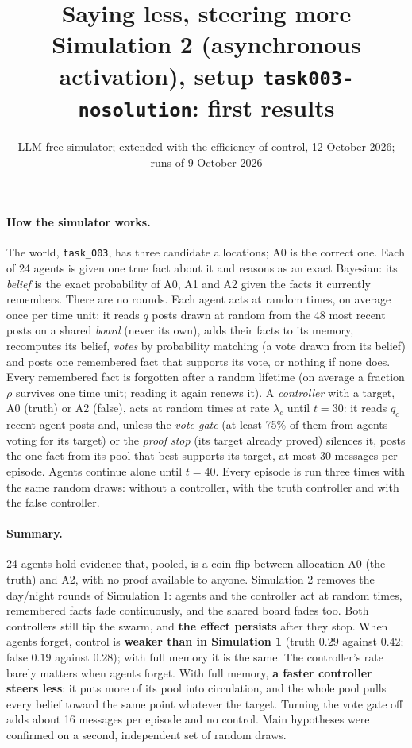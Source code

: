 \documentclass[10pt,a4paper]{article}
\title{\vspace{-1.2cm}\textbf{Saying less, steering more}\\[2pt]
\large Simulation 2 (asynchronous activation), setup \texttt{task003-nosolution}: first results}
\author{LLM-free simulator; extended with the efficiency of control, 12 October 2026; runs of 9 October 2026}
\date{}
\begin{document}
\maketitle
\vspace{-1cm}

\paragraph{How the simulator works.} The world, \texttt{task\_003}, has three candidate
allocations; A0 is the correct one. Each of 24 agents is given one true fact about it and reasons as
an exact Bayesian: its \emph{belief} is the exact probability of A0, A1 and A2 given the facts it
currently remembers. There are no rounds. Each agent acts at random times, on average once per time
unit: it reads $q$ posts drawn at random from the 48 most recent posts on a shared \emph{board}
(never its own), adds their facts to its memory, recomputes its belief, \emph{votes} by probability
matching (a vote drawn from its belief) and posts one remembered fact that supports its vote, or
nothing if none does. Every remembered fact is forgotten after a random lifetime (on average a
fraction $\rho$ survives one time unit; reading it again renews it). A \emph{controller} with a
target, A0 (truth) or A2 (false), acts at random times at rate $\lambda_c$ until $t = 30$: it reads
$q_c$ recent agent posts and, unless the \emph{vote gate} (at least 75\% of them from agents voting
for its target) or the \emph{proof stop} (its target already proved) silences it, posts the one fact
from its pool that best supports its target, at most 30 messages per episode. Agents continue alone
until $t = 40$. Every episode is run three times with the same random draws: without a controller,
with the truth controller and with the false controller.

\paragraph{Summary.} 24 agents hold evidence that, pooled, is a coin flip between allocation
A0 (the truth) and A2, with no proof available to anyone. Simulation 2 removes the day/night
rounds of Simulation 1: agents and the controller act at random times, remembered facts fade
continuously, and the shared board fades too. Both controllers still tip the swarm, and
\textbf{the effect persists} after they stop. When agents forget, control is
\textbf{weaker than in Simulation 1} (truth $0.29$ against $0.42$; false $0.19$ against
$0.28$); with full memory it is the same. The controller's rate barely matters when agents
forget. With full memory, \textbf{a faster controller steers less}: it puts more of its pool
into circulation, and the whole pool pulls every belief toward the same point whatever the
target. Turning the vote gate off adds about 16 messages per episode and no control.
Main hypotheses were confirmed on a second, independent set of random draws.
\end{document}
